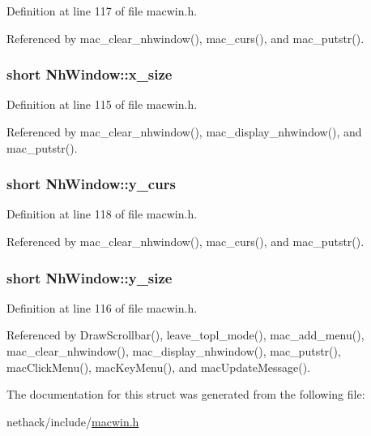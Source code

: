 Definition at line 117 of file macwin.\+h.



Referenced by mac\+\_\+clear\+\_\+nhwindow(), mac\+\_\+curs(), and mac\+\_\+putstr().

\hypertarget{structNhWindow_a10d785f6f3a83f1148b0cfee07fd71ef}{
\subsubsection[{x\+\_\+size}]{\setlength{\rightskip}{0pt plus 5cm}short Nh\+Window\+::x\+\_\+size}}\label{structNhWindow_a10d785f6f3a83f1148b0cfee07fd71ef}


Definition at line 115 of file macwin.\+h.



Referenced by mac\+\_\+clear\+\_\+nhwindow(), mac\+\_\+display\+\_\+nhwindow(), and mac\+\_\+putstr().

\hypertarget{structNhWindow_a1ce884e1926c5e62d509589c419c0b80}{
\subsubsection[{y\+\_\+curs}]{\setlength{\rightskip}{0pt plus 5cm}short Nh\+Window\+::y\+\_\+curs}}\label{structNhWindow_a1ce884e1926c5e62d509589c419c0b80}


Definition at line 118 of file macwin.\+h.



Referenced by mac\+\_\+clear\+\_\+nhwindow(), mac\+\_\+curs(), and mac\+\_\+putstr().

\hypertarget{structNhWindow_ace64e7fc7598255924aaa8334766feff}{
\subsubsection[{y\+\_\+size}]{\setlength{\rightskip}{0pt plus 5cm}short Nh\+Window\+::y\+\_\+size}}\label{structNhWindow_ace64e7fc7598255924aaa8334766feff}


Definition at line 116 of file macwin.\+h.



Referenced by Draw\+Scrollbar(), leave\+\_\+topl\+\_\+mode(), mac\+\_\+add\+\_\+menu(), mac\+\_\+clear\+\_\+nhwindow(), mac\+\_\+display\+\_\+nhwindow(), mac\+\_\+putstr(), mac\+Click\+Menu(), mac\+Key\+Menu(), and mac\+Update\+Message().



The documentation for this struct was generated from the following file\+:\begin{DoxyCompactItemize}
\item 
nethack/include/\hyperlink{macwin_8h}{macwin.\+h}\end{DoxyCompactItemize}

